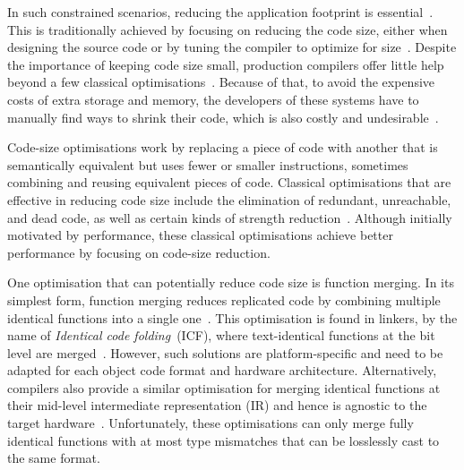 In such constrained scenarios, reducing the application footprint is essential~\cite{schultz03,varma04,sehgal12,keoh14,auler17}.
This is traditionally achieved by focusing on reducing the code size, either when designing the source code or by tuning the compiler to optimize for size~\cite{fisher05,sehgal12,hennessy17,rocha19}.
Despite the importance of keeping code size small, production compilers offer little help beyond a few classical optimisations~\cite{cocke70,briggs97,debray00}.
Because of that, to avoid the expensive costs of extra storage and memory, the developers of these systems have to manually find ways to shrink their code, which is also costly and undesirable~\cite{keoh14,weaver09}.

Code-size optimisations work by replacing a piece of code with another that is semantically equivalent but uses fewer or smaller instructions, sometimes combining and reusing equivalent pieces of code.
Classical optimisations that are effective in reducing code size include the elimination of redundant, unreachable, and dead code, as well as certain kinds of strength reduction~\cite{cocke70,briggs97,debray00}.
Although initially motivated by performance, these classical optimisations achieve better performance by focusing on code-size reduction.

One optimisation that can potentially reduce code size is function merging.
In its simplest form, function merging reduces replicated code by combining multiple identical functions into a single one~\cite{llvm-fm,livska14}.
This optimisation is found in linkers, by the name of \textit{Identical code folding}~(ICF), where text-identical functions at the bit level are merged~\cite{tallam10,kwan12,msvc-icf}.
However, such solutions are platform-specific and need to be adapted for each object code format and hardware architecture.
Alternatively, compilers also provide a similar optimisation for merging identical functions at their mid-level intermediate representation (IR) and hence is agnostic to the target hardware~\cite{llvm-fm,livska14}.
Unfortunately, these optimisations can only merge fully identical functions with at most type mismatches that can be losslessly cast to the same format.

